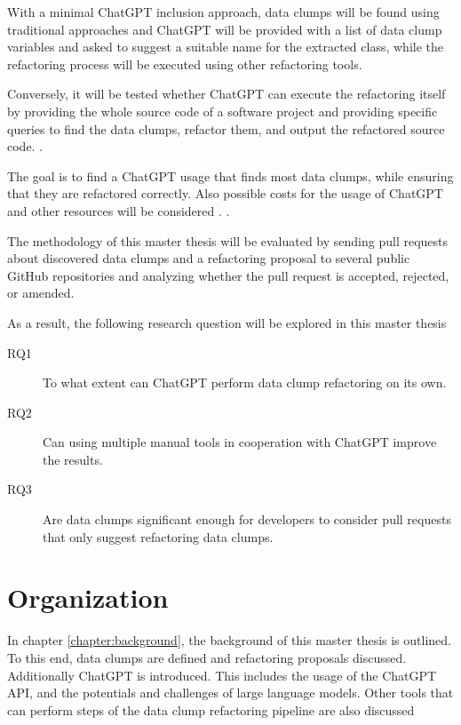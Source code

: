 With a minimal ChatGPT inclusion approach,  data clumps will be found using traditional approaches and ChatGPT will be provided with a list of data clump variables and asked to suggest a suitable name for the extracted class, while the refactoring process will be executed using other refactoring tools.


Conversely, it will be tested whether ChatGPT can execute the refactoring itself by providing the whole source code of a software project and providing specific queries to find the data clumps, refactor them, and output the refactored source code. \cite{White2023ChatGPTPP}.


The goal is to find a ChatGPT usage that finds most data clumps, while ensuring that they are refactored correctly. Also possible costs for the usage of ChatGPT and other resources will be considered \cite{xia2023conversation}. \cite{4ef0b456377aafb68884e643779dffb36b8e7cc1}.


The methodology of this master thesis will be evaluated by sending  pull requests about discovered data clumps and a refactoring proposal to several public GitHub repositories and analyzing whether the pull request is accepted, rejected, or amended.   

As a result, the following research question will be explored in this master thesis

\begin{description}
    \item [RQ1] To what extent can ChatGPT perform data clump refactoring on its own.
    \item [RQ2] Can using multiple manual tools in cooperation with ChatGPT improve the results.
    \item [RQ3] Are data clumps significant enough for developers to consider pull requests that only suggest refactoring data clumps. 
\end{description}

\section{Organization}

In chapter \ref{chapter:background}, the background of this master thesis  is outlined. To this end, data clumps are defined and refactoring proposals discussed. Additionally ChatGPT is introduced. This includes the usage of the ChatGPT \ac{API}, and the potentials and challenges of large language models. Other tools that can perform  steps of the data clump refactoring pipeline are also discussed 

